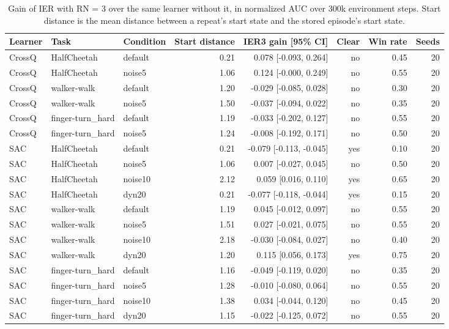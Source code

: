 \begin{table}[t]
\centering
\small
\begin{tabular}{lllrrrrr}
\toprule
Learner & Task & Condition & Start distance & IER3 gain [95\% CI] & Clear & Win rate & Seeds \\
\midrule
CrossQ & HalfCheetah & default & 0.21 & 0.078 [-0.093, 0.264] & no & 0.45 & 20 \\
CrossQ & HalfCheetah & noise5 & 1.06 & 0.124 [-0.000, 0.249] & no & 0.55 & 20 \\
CrossQ & walker-walk & default & 1.20 & -0.029 [-0.085, 0.028] & no & 0.30 & 20 \\
CrossQ & walker-walk & noise5 & 1.50 & -0.037 [-0.094, 0.022] & no & 0.35 & 20 \\
CrossQ & finger-turn\_hard & default & 1.19 & -0.033 [-0.202, 0.127] & no & 0.55 & 20 \\
CrossQ & finger-turn\_hard & noise5 & 1.24 & -0.008 [-0.192, 0.171] & no & 0.50 & 20 \\
SAC & HalfCheetah & default & 0.21 & -0.079 [-0.113, -0.045] & yes & 0.10 & 20 \\
SAC & HalfCheetah & noise5 & 1.06 & 0.007 [-0.027, 0.045] & no & 0.50 & 20 \\
SAC & HalfCheetah & noise10 & 2.12 & 0.059 [0.016, 0.110] & yes & 0.65 & 20 \\
SAC & HalfCheetah & dyn20 & 0.21 & -0.077 [-0.118, -0.044] & yes & 0.15 & 20 \\
SAC & walker-walk & default & 1.19 & 0.045 [-0.012, 0.097] & no & 0.55 & 20 \\
SAC & walker-walk & noise5 & 1.51 & 0.027 [-0.021, 0.075] & no & 0.55 & 20 \\
SAC & walker-walk & noise10 & 2.18 & -0.030 [-0.084, 0.027] & no & 0.40 & 20 \\
SAC & walker-walk & dyn20 & 1.20 & 0.115 [0.056, 0.173] & yes & 0.75 & 20 \\
SAC & finger-turn\_hard & default & 1.16 & -0.049 [-0.119, 0.020] & no & 0.35 & 20 \\
SAC & finger-turn\_hard & noise5 & 1.28 & -0.010 [-0.080, 0.064] & no & 0.55 & 20 \\
SAC & finger-turn\_hard & noise10 & 1.38 & 0.034 [-0.044, 0.120] & no & 0.45 & 20 \\
SAC & finger-turn\_hard & dyn20 & 1.15 & -0.022 [-0.125, 0.072] & no & 0.55 & 20 \\
\bottomrule
\end{tabular}
\caption{Gain of IER with RN = 3 over the same learner without it, in normalized AUC over 300k environment steps. Start distance is the mean distance between a repeat's start state and the stored episode's start state.}
\label{tab:stress}
\end{table}
